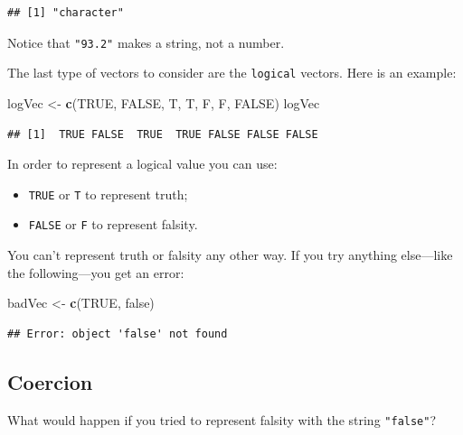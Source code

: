 \documentclass[]{book}
\makeatletter
\newenvironment{Shaded}{\begin{snugshade}}{\end{snugshade}}
\newcommand{\KeywordTok}[1]{\textcolor[rgb]{0.13,0.29,0.53}{\textbf{#1}}}
\newcommand{\StringTok}[1]{\textcolor[rgb]{0.31,0.60,0.02}{#1}}
\newcommand{\OtherTok}[1]{\textcolor[rgb]{0.56,0.35,0.01}{#1}}
\newcommand{\NormalTok}[1]{#1}
\providecommand{\tightlist}{%
  \setlength{\itemsep}{0pt}\setlength{\parskip}{0pt}}
\newenvironment{kframe}{%
\medskip{}
\setlength{\fboxsep}{.8em}
 \def\at@end@of@kframe{}%
 \ifinner\ifhmode%
  \def\at@end@of@kframe{\end{minipage}}%
  \begin{minipage}{\columnwidth}%
 \fi\fi%
 \def\FrameCommand##1{\hskip\@totalleftmargin \hskip-\fboxsep
 \colorbox{shadecolor}{##1}\hskip-\fboxsep
     \hskip-\linewidth \hskip-\@totalleftmargin \hskip\columnwidth}%
 \MakeFramed {\advance\hsize-\width
   \@totalleftmargin\z@ \linewidth\hsize
   \@setminipage}}%
 {\par\unskip\endMakeFramed%
 \at@end@of@kframe}
\renewenvironment{Shaded}{\begin{kframe}}{\end{kframe}}
\theoremstyle{definition}
\theoremstyle{definition}
\theoremstyle{definition}
\theoremstyle{remark}
\makeatother
\begin{document}
\begin{verbatim}
## [1] "character"
\end{verbatim}

Notice that \texttt{"93.2"} makes a string, not a number.

The last type of vectors to consider are the
\texttt{logical} vectors. Here is an example:

\begin{Shaded}
\begin{Highlighting}[]
\NormalTok{logVec <-}\StringTok{ }\KeywordTok{c}\NormalTok{(}\OtherTok{TRUE}\NormalTok{, }\OtherTok{FALSE}\NormalTok{, T, T, F, F, }\OtherTok{FALSE}\NormalTok{)}
\NormalTok{logVec}
\end{Highlighting}
\end{Shaded}

\begin{verbatim}
## [1]  TRUE FALSE  TRUE  TRUE FALSE FALSE FALSE
\end{verbatim}

In order to represent a logical value you can use:

\begin{itemize}
\tightlist
\item
  \texttt{TRUE} or \texttt{T} to represent truth;
\item
  \texttt{FALSE} or \texttt{F} to represent falsity.
\end{itemize}

You can't represent truth or falsity any other way. If you try anything
else---like the following---you get an error:

\begin{Shaded}
\begin{Highlighting}[]
\NormalTok{badVec <-}\StringTok{ }\KeywordTok{c}\NormalTok{(}\OtherTok{TRUE}\NormalTok{, false)}
\end{Highlighting}
\end{Shaded}

\begin{verbatim}
## Error: object 'false' not found
\end{verbatim}

\subsection{Coercion}\label{coercion}

What would happen if you tried to represent falsity with the string
\texttt{"false"}?
\end{document}
